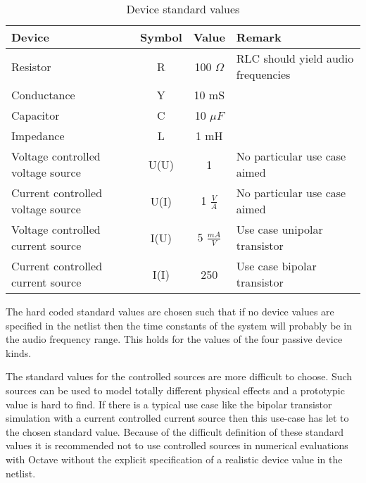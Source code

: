 \begin{table}[bt]
\begin{center}
\begin{tabular}{|l|c|c|l|}

\hline

Device & Symbol & Value & Remark \\
\hline

\hline

Resistor                          & R    & 100 $\Omega$     & RLC should yield audio frequencies \\
Conductance                       & Y    & 10 mS            &                                    \\
Capacitor                         & C    & 10 $\mu F$       &                                    \\
Impedance                         & L    & 1 mH             &                                    \\
Voltage controlled voltage source & U(U) & 1                & No particular use case aimed       \\
Current controlled voltage source & U(I) & 1 $\frac{V}{A}$  & No particular use case aimed       \\
Voltage controlled current source & I(U) & 5 $\frac{mA}{V}$ & Use case unipolar transistor       \\
Current controlled current source & I(I) & 250              & Use case bipolar transistor        \\

\hline

\end{tabular}
\caption{Device standard values}
\label{tabDeviceStdValues}
\end{center}
\end{table}

The hard coded standard values are chosen such that if no device values are
specified in the netlist then the time constants of the system will
probably be in the audio frequency range. This holds for the values of
the four passive device kinds.

The standard values for the controlled sources are more difficult to
choose. Such sources can be used to model totally different physical
effects and a prototypic value is hard to find. If there is a typical use
case like the bipolar transistor simulation with a current controlled
current source then this use-case has let to the chosen standard value.
Because of the difficult definition of these standard values it is
recommended not to use controlled sources in numerical evaluations with
Octave without the explicit specification of a realistic device value in
the netlist.

